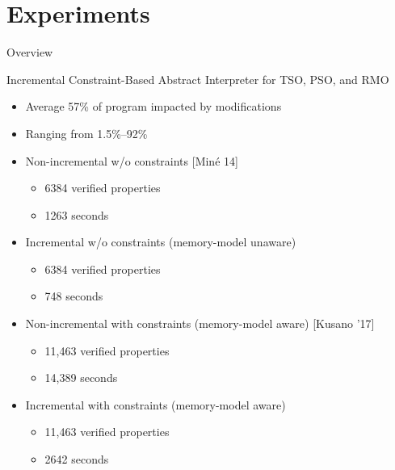\documentclass[t]{beamer}
\begin{document}
\section{Experiments}

\begin{frame}{Overview}
\end{frame}

\begin{frame}{Incremental Constraint-Based Abstract Interpreter for TSO, PSO, and RMO}
  \begin{itemize}[<+->]
      \item Average 57\% of program impacted by modifications
      \item Ranging from 1.5\%--92\%
      \item Non-incremental w/o constraints [Min\'{e} 14]
        \begin{itemize}
          \item 6384 verified properties
          \item 1263 seconds
        \end{itemize}
      \item Incremental w/o constraints (memory-model unaware)
        \begin{itemize}
          \item 6384 verified properties
          \item 748 seconds
        \end{itemize}
      \item Non-incremental with constraints (memory-model aware) [Kusano '17]
        \begin{itemize}
          \item 11,463 verified properties
          \item 14,389 seconds
        \end{itemize}
      \item Incremental with constraints (memory-model aware)
        \begin{itemize}
          \item 11,463 verified properties
          \item 2642 seconds
        \end{itemize}
    \end{itemize}
  \note{
    \begin{itemize}

\end{itemize}}
\end{frame}
\end{document}
